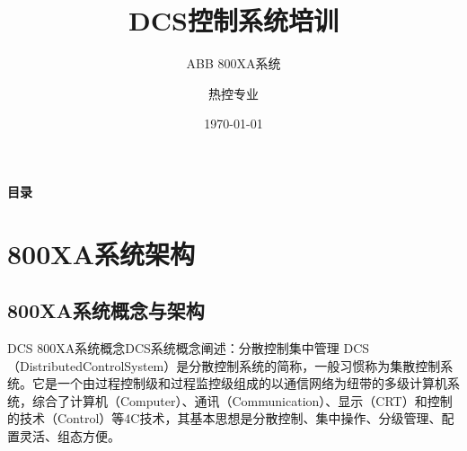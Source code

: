 \documentclass[12pt,hyperref={CJKbookmarks=true}]{beamer} %
\begin{document}
	
	\kaishu
	
	\title{DCS控制系统培训}
\subtitle{ABB 800XA系统}
	\author{热控专业}
	\date{\today}
	\begin{frame}
		\titlepage
	\end{frame}
\begin{frame}{\textbf{目录}}
\tableofcontents
\end{frame}
	\section{800XA系统架构}
	\subsection{800XA系统概念与架构}
	\begin{frame}{DCS 800XA系统概念}{DCS系统概念阐述：分散控制集中管理}
		DCS（DistributedControlSystem）是分散控制系统的简称，一般习惯称为集散控制系统。它是一个由过程控制级和过程监控级组成的以通信网络为纽带的多级计算机系统，综合了计算机（Computer）、通讯（Communication）、显示（CRT）和控制的技术（Control）等4C技术，其基本思想是分散控制、集中操作、分级管理、配置灵活、组态方便。
	\end{frame}
\end{document}
